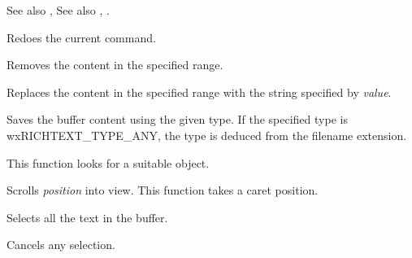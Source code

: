 See also , See also , .

\label{wxrichtextctrlredo}


Redoes the current command.

\label{wxrichtextctrlremove}


Removes the content in the specified range.

\label{wxrichtextctrlreplace}


Replaces the content in the specified range with the string specified by {\it value}.

\label{wxrichtextctrlsavefile}


Saves the buffer content using the given type. If the specified type
is wxRICHTEXT\_TYPE\_ANY, the type is deduced from the filename extension.

This function looks for a suitable  object.

\label{wxrichtextctrlscrollintoview}


Scrolls {\it position} into view. This function takes a caret position.

\label{wxrichtextctrlselectall}


Selects all the text in the buffer.

\label{wxrichtextctrlselectnone}


Cancels any selection.

